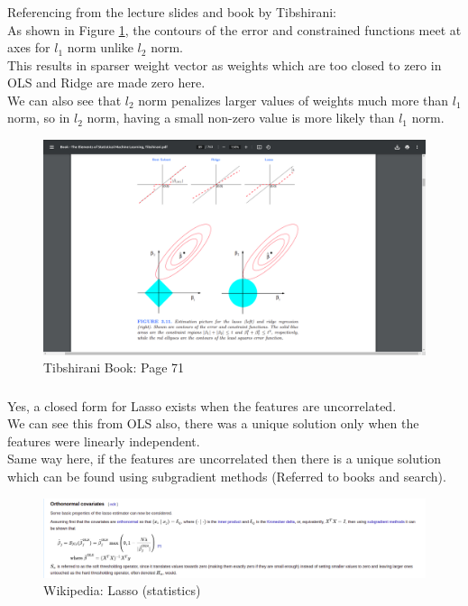 \documentclass[12pt, fleqn]{article}
\begin{document}
\subsubsection{}
Referencing from the lecture slides and book by Tibshirani: \\
As shown in Figure \ref{tibs}, the contours of the error and constrained functions meet at axes for $l_1$ norm unlike $l_2$ norm. \\
This results in sparser weight vector as weights which are too closed to zero in OLS and Ridge are made zero here. \\
We can also see that $l_2$ norm penalizes larger values of weights much more than $l_1$ norm, so in $l_2$ norm, having a small non-zero value is more likely than $l_1$ norm.
\begin{figure}[H]
  \centering
  \includegraphics[scale=0.25]{tibshirani_l1_l2.png}
  \caption{Tibshirani Book: Page 71}
  \label{tibs}
\end{figure}

\subsubsection{}
Yes, a closed form for Lasso exists when the features are uncorrelated. \\
We can see this from OLS also, there was a unique solution only when the features were linearly independent. \\
Same way here, if the features are uncorrelated then there is a unique solution which can be found using subgradient methods (Referred to books and search). \\
\begin{figure}[H]
  \centering
  \includegraphics[scale=0.3]{wikipedia_lasso.png}
  \caption{Wikipedia: Lasso (statistics)}
\end{figure}
\end{document}
